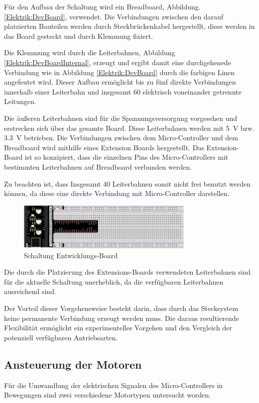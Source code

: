 \documentclass[conference,compsoc,final,a4paper]{IEEEtran}
\begin{document}
Für den Aufbau der Schaltung wird ein Breadboard, Abbildung. \ref{Elektrik:DevBoard}, verwendet. Die Verbindungen zwischen den darauf platzierten Bauteilen werden durch Steckbrückenkabel hergestellt, diese werden in das Board gesteckt und durch Klemmung fixiert.

Die Klemmung wird durch die Leiterbahnen, Abbildung \ref{Elektrik:DevBoardInternal}, erzeugt und ergibt damit eine durchgehenede Verbindung wie in Abbildung \ref{Elektrik:DevBoard} durch die farbigen Linen angefeutet wird. 
Dieser Aufbau ermöglicht bis zu fünf direkte Verbindungen innerhalb einer Leiterbahn und insgesamt 60 elektrisch voneinander getrennte Leitungen.

\noindent Die äußeren Leiterbahnen sind für die Spannungsversorgung vorgesehen und erstrecken sich über das gesamte Board. Diese Leiterbahnen werden mit \qty{5}{V} bzw. \qty{3,3}{V} betrieben.
Die Verbindungen zwischen dem Micro-Controller und dem Breadboard wird mithilfe eines Extension Boards hergestellt. Das Extension-Board ist so konzipiert, 
dass die einzelnen Pins des Micro-Controllers mit bestimmten Leiterbahnen auf Breadboard verbunden werden.

\noindent Zu beachten ist, dass Insgesamt 40 Leiterbahnen somit nicht frei benutzt werden können, da diese eine direkte Verbindung mit Micro-Controller darstellen.
\begin{figure}[h]
\centering
\includegraphics[width=8.5cm]{../images/ext_board.png}
\caption{Schaltung Entwicklungs-Board \autocite{freenoveTutorial}}
\label{Elektrik:DevBoardext}
\end{figure}

\noindent Die durch die Platzierung des Extensions-Boards verwendeten Leiterbahnen sind für die aktuelle Schaltung unerheblich, da die verfügbaren Leiterbahnen ausreichend sind.

\noindent Der Vorteil dieser Vorgehensweise besteht darin, dass durch das Stecksystem keine permanente Verbindung erzeugt werden muss. 
Die daraus resultierende Flexibilität ermöglicht ein experimentelles Vorgehen und den Vergleich der potenziell verfügbaren Antriebsarten.

\subsection{Ansteuerung der Motoren}
Für die Umwandlung der elektrischen Signalen des Micro-Controllers in Bewegungen sind zwei verschiedene Motortypen untersucht worden.
\end{document}

